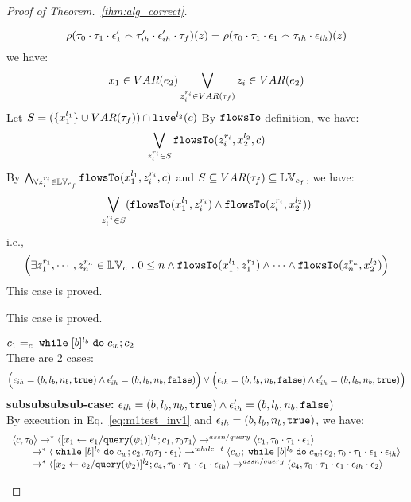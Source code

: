 \begin{proof}[Proof of Theorem.~\ref{thm:alg_correct}]
\begin{case}
\begin{subcase}
\begin{subsubcase}
\begin{subsubsubcase}
\begin{subproof}
\begin{enumerate}
\begin{enumerate}
\[  \rho(\mathtt{\tau}_0 \cdot \mathtt{\tau}_1 \cdot \mathtt{\epsilon}_1' \smallfrown \mathtt{\tau}_{ih}' \cdot \mathtt{\epsilon}_{ih}' \cdot \mathtt{\tau}_f)(z) 
  = \rho(\mathtt{\tau}_0 \cdot \mathtt{\tau}_1 \cdot \mathtt{\epsilon}_1 \smallfrown \mathtt{\tau}_{ih} \cdot \mathtt{\epsilon}_{ih})(z)
\]
%
we have:
\[
  x_1 \in VAR(e_2) \bigvee_{z_i^{r_i} \in VAR{(\mathtt{\tau}_f)}} z_i \in VAR(e_2)
\]
%
Let $S = (\{x_1^{l_1}\} \cup VAR{(\mathtt{\tau}_f)}) \cap \mathtt{live}^{l_2}(c) $
%
By $\mathtt{flowsTo}$ definition, we have:
\[
   \bigvee_{z_i^{r_i} \in S}  \mathtt{flowsTo}(z_i^{r_i}, x_2^{l_2}, c)
\]
By $ \bigwedge_{\forall z_i^{r_i} \in \mathbb{LV}_{c_f}} \mathtt{flowsTo}(x_1^{l_1}, z_i^{r_i}, c)$ and $S \subseteq VAR{(\mathtt{\tau}_f)} \subseteq \mathbb{LV}_{c_f}$, we have:
\[
\bigvee_{z_i^{r_i} \in S} 
(\mathtt{flowsTo}(x_1^{l_1}, z_i^{r_i}) \land \mathtt{flowsTo}(z_i^{r_i}, x_2^{l_2}))
\]
%
i.e.,
\[
\Big(\exists z_1^{r_1}, \cdots, z_n^{r_n} \in \mathbb{LV}_{{c}} ~.~ 0 \leq n 
 \land \mathtt{flowsTo}(x_1^{l_1}, z_1^{r_1}) \land \cdots \land \mathtt{flowsTo}(z_n^{r_n}, {x}_2^{l_2}) \Big)
\]
%
This case is proved.
\end{enumerate}
%
\end{enumerate}
%
This case is proved.
\end{subproof}
%
\begin{subproof} $c_1 =_c \;\mathtt{while}\; [b]^{l_b} \;\mathtt{do}\; c_w;{c}_2$ 
%
\\
There are 2 cases:
$$
\Big(\mathtt{\epsilon}_{ih} = (b, l_b, n_b, \mathtt{true}) \land \mathtt{\epsilon}_{ih}' = (b, l_b, n_b, \mathtt{false}) \Big)
\lor 
\Big(\mathtt{\epsilon}_{ih} = (b, l_b, n_b, \mathtt{false}) \land \mathtt{\epsilon}_{ih}' = (b, l_b, n_b, \mathtt{true}) \Big)
$$
%
\textbf{subsubsubsub-case:} $\mathtt{\epsilon}_{ih} = (b, l_b, n_b, \mathtt{true}) \land \mathtt{\epsilon}_{ih}' = (b, l_b, n_b, \mathtt{false})$
\\
By execution in Eq.~\ref{eq:m1test_inv1} and $\mathtt{\epsilon}_{ih} = (b, l_b, n_b, \mathtt{true})$, we have:
\[
  \begin{array}{l}   
  \langle {c}, \mathtt{\tau}_0 \rangle \rightarrow^{*} 
  \langle [\mathrel{ {x}_1 \leftarrow e_1 / {\tt query}(\psi_1) }]^{l_1} ; {c}_1, \mathtt{\tau}_0 \mathtt{\tau}_1 \rangle  
  \rightarrow^{assn/query}
  \langle c_1, \mathtt{\tau}_0 \cdot \mathtt{\tau}_1 \cdot \mathtt{\epsilon}_1 \rangle 
  \\
  \qquad \rightarrow^{*} 
  \langle \;\mathtt{while}\; [b]^{l_b} \;\mathtt{do}\; c_w;{c}_2, 
  \mathtt{\tau}_0 \mathtt{\tau}_1 \cdot \mathtt{\epsilon}_1 \rangle 
  \rightarrow^{while-t} 
  \langle c_w;\;\mathtt{while}\; [b]^{l_b} \;\mathtt{do}\; c_w; c_2, \mathtt{\tau}_0 \cdot \mathtt{\tau}_1 \cdot \mathtt{\epsilon}_1 \cdot \mathtt{\epsilon}_{ih} \rangle 
  \\
  \qquad \rightarrow^{*} 
  \langle [\mathrel{ {x}_2 \leftarrow e_2 / {\tt query}(\psi_2) }]^{l_2};{c}_4, 
  \mathtt{\tau}_0 \cdot \mathtt{\tau}_1 \cdot \mathtt{\epsilon}_1 \cdot \mathtt{\epsilon}_{ih} \rangle 
  \rightarrow^{assn/query} 
  \langle {c}_4,  \mathtt{\tau}_0 \cdot \mathtt{\tau}_1 \cdot \mathtt{\epsilon}_1 \cdot \mathtt{\epsilon}_{ih} \cdot \mathtt{\epsilon}_2 \rangle 

\end{array}\]
\end{subproof}
\end{subsubsubcase}
\end{subsubcase}
\end{subcase}
\end{case}
\end{proof}
